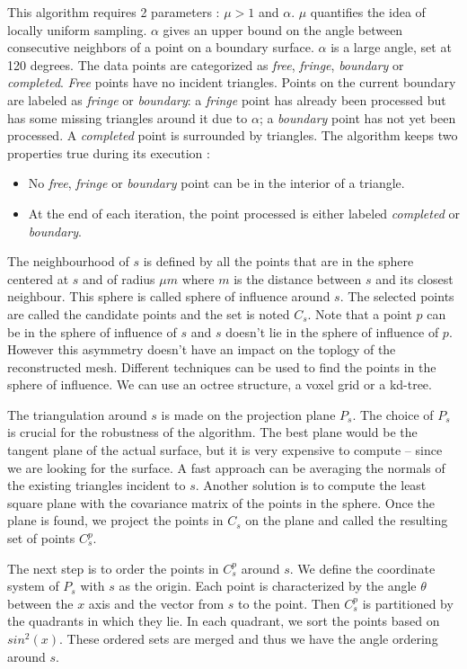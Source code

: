 \documentclass[12pt]{article}
\begin{document}
This algorithm requires 2 parameters : $\mu > 1$ and $\alpha$. $\mu$ quantifies the idea of locally uniform sampling. $\alpha$ gives an upper bound on the angle between consecutive neighbors of a point on a boundary surface. $\alpha$ is a large angle, set at 120 degrees. The data points are categorized as \textit{free}, \textit{fringe}, \textit{boundary} or \textit{completed}. \textit{Free} points have no incident triangles. Points on the current boundary are labeled as \textit{fringe} or \textit{boundary}: a \textit{fringe} point has already been processed but has some missing triangles around it due to $\alpha$; a \textit{boundary} point has not yet been processed. A \emph{completed} point is surrounded by triangles. The algorithm keeps two properties true during its execution :
\begin{itemize}
\item No \textit{free}, \textit{fringe} or \textit{boundary} point can be in the interior of a triangle.
\item At the end of each iteration, the point processed is either labeled \textit{completed} or \textit{boundary}.
\end{itemize}

The neighbourhood of $s$ is defined by all the points that are in the sphere centered at $s$ and of radius $\mu m$ where $m$ is the distance between $s$ and its closest neighbour. This sphere is called sphere of influence around $s$. The selected points are called the candidate points and the set is noted $C_s$. Note that a point $p$ can be in the sphere of influence of $s$ and $s$ doesn't lie in the sphere of influence of $p$. However this asymmetry doesn't have an impact on the toplogy of the reconstructed mesh. Different techniques can be used to find the points in the sphere of influence. We can use an octree structure, a voxel grid or a kd-tree.

The triangulation around $s$ is made on the projection plane $P_s$. The choice of $P_s$ is crucial for the robustness of the algorithm. The best plane would be the tangent plane of the actual surface, but it is very expensive to compute -- since we are looking for the surface. A fast approach can be averaging the normals of the existing triangles incident to $s$. Another solution is to compute the least square plane with the covariance matrix of the points in the sphere. Once the plane is found, we project the points in $C_s$ on the plane and called the resulting set of points $C^p_s$.

The next step is to order the points in $C^p_s$ around $s$. We define the coordinate system of $P_s$ with $s$ as the origin. Each point is characterized by the angle $\theta$ between the $x$ axis and the vector from $s$ to the point. Then $C^p_s$ is partitioned by the quadrants in which they lie. In each quadrant, we sort the points based on $sin^2(x)$. These ordered sets are merged and thus we have the angle ordering around $s$.
\end{document}
